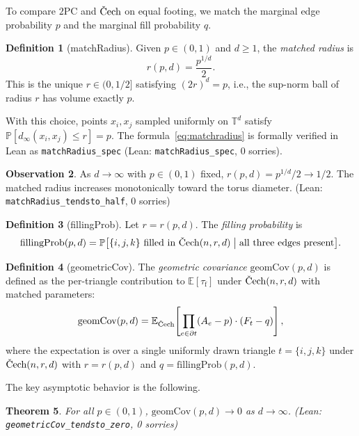\documentclass[reqno,12pt]{amsart}
\newcommand{\tauf}{\tau_{\mathrm{f}}}
\newcommand{\PC}{\mathrm{2PC}}
\newcommand{\Cech}{\ifmmode\text{\v{C}ech}\else\v{C}ech\fi}  %
\newcommand{\geomCov}{\mathrm{geomCov}}
\newcommand{\fillingP}{\mathrm{fillingProb}}
\newcommand{\TT}{\mathbb{T}}         %
\newcommand{\EE}{\mathbb{E}}
\newcommand{\PP}{\mathbb{P}}
\newcommand{\lean}[1]{\textup{\texttt{\small #1}}}
\newcommand{\leanverified}[1]{\textup{(Lean: \texttt{#1}, 0 sorries)}}
\theoremstyle{plain}
\newtheorem{theorem}{Theorem}[section]
\theoremstyle{definition}
\newtheorem{definition}[theorem]{Definition}
\newtheorem{observation}[theorem]{Observation}
\theoremstyle{remark}
\begin{document}
To compare $\PC$ and $\Cech$ on equal footing, we match the marginal edge probability $p$
and the marginal fill probability $q$.

\begin{definition}[matchRadius]\label{def:matchradius}
Given $p\in(0,1)$ and $d\geq 1$, the \emph{matched radius} is
\begin{equation}\label{eq:matchradius}
  r(p,d) = \frac{p^{1/d}}{2}.
\end{equation}
This is the unique $r\in(0,1/2]$ satisfying $(2r)^d = p$, i.e., the sup-norm ball of radius
$r$ has volume exactly $p$.
\end{definition}

With this choice, points $x_i, x_j$ sampled uniformly on $\TT^d$ satisfy
$\PP[d_\infty(x_i,x_j)\leq r] = p$. The formula~\eqref{eq:matchradius} is formally verified
in Lean as \lean{matchRadius\_spec} \leanverified{matchRadius\_spec}.

\begin{observation}\label{obs:matchradius-half}
As $d\to\infty$ with $p\in(0,1)$ fixed, $r(p,d) = p^{1/d}/2\to 1/2$. The matched radius
increases monotonically toward the torus diameter.
\hfill \leanverified{matchRadius\_tendsto\_half}
\end{observation}

\begin{definition}[fillingProb]\label{def:fillingprob}
Let $r = r(p,d)$. The \emph{filling probability} is
\[
  \fillingP(p,d)
  = \PP\bigl[\{i,j,k\}\text{ filled in }\Cech(n,r,d) \;\big|\; \text{all three edges present}\bigr].
\]
\end{definition}

\begin{definition}[geometricCov]\label{def:geomcov}
The \emph{geometric covariance} $\geomCov(p,d)$ is defined as the per-triangle contribution
to $\EE[\tauf]$ under $\Cech(n,r,d)$ with matched parameters:
\begin{equation}\label{eq:geomcov-def}
  \geomCov(p,d) = \EE_{\Cech}\!\left[\prod_{e\in\partial t}(A_e - p)\cdot(F_t - q)\right],
\end{equation}
where the expectation is over a single uniformly drawn triangle $t = \{i,j,k\}$ under
$\Cech(n,r,d)$ with $r = r(p,d)$ and $q = \fillingP(p,d)$.
\end{definition}

The key asymptotic behavior is the following.

\begin{theorem}\label{thm:geomcov-zero}
For all $p\in(0,1)$, $\geomCov(p,d)\to 0$ as $d\to\infty$.
\hfill \leanverified{geometricCov\_tendsto\_zero}
\end{theorem}
\end{document}
